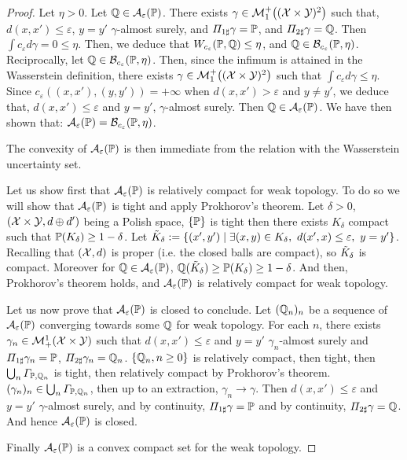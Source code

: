 \begin{proof}
Let $\eta>0$. Let $\mathbb{Q}\in\mathcal{A}_\varepsilon(\mathbb{P})$. There exists $\gamma\in
\mathcal{M}^+_1\left((\XX\times\YY)^2\right)$ such that, $d(x,x')\leq\varepsilon$, $y=y'$ $\gamma$-almost surely, and $\Pi_{1\sharp}\gamma=\mathbb{P}$, and $\Pi_{2\sharp}\gamma=\mathbb{Q}$. Then $\int c_\varepsilon d \gamma = 0\leq \eta$. Then, we deduce that $W_{c_\varepsilon}(\mathbb{P},\mathbb{Q})\leq \eta$, and $\mathbb{Q}\in\mathcal{B}_{c_\varepsilon}(\mathbb{P},\eta)$. Reciprocally, let $\mathbb{Q}\in\mathcal{B}_{c_\varepsilon}(\mathbb{P},\eta)$. Then, since the infimum is attained in the Wasserstein definition, there exists $\gamma\in
\mathcal{M}^+_1\left((\XX\times\YY)^2\right)$ such that $\int c_\varepsilon d \gamma \leq \eta$. Since $c_\varepsilon((x,x'),(y,y'))=+\infty$ when $d(x,x')>\varepsilon$ and $y\neq y'$, we deduce that, $d(x,x')\leq\varepsilon$ and $y=y'$, $\gamma$-almost surely. Then $\mathbb{Q}\in\mathcal{A}_\varepsilon(\mathbb{P})$. We have then shown that: $\mathcal{A}_\varepsilon(\mathbb{P})=\mathcal{B}_{c_\varepsilon}(\mathbb{P},\eta)$.

The convexity of $\mathcal{A}_\varepsilon(\mathbb{P})$ is then immediate from the relation with the Wasserstein uncertainty set.

Let us show first that $\mathcal{A}_\varepsilon(\mathbb{P})$ is relatively compact for weak topology. To do so we will show that $\mathcal{A}_\varepsilon(\mathbb{P})$ is tight and apply Prokhorov's theorem. Let $\delta>0$, $(\mathcal{X}\times \mathcal{Y},d\oplus d')$ being a Polish space, $\{\mathbb{P}\}$ is tight then there exists $K_\delta$ compact such that $\mathbb{P}(K_\delta)\geq1-\delta$.
Let $\Tilde{K}_\delta:=\left\{(x',y')\mid \exists (x,y)\in K_\delta,~ d(x',x)\leq\varepsilon,~y=y'\right\}$.  Recalling that $(\mathcal{X},d)$ is proper (i.e. the closed balls are compact), so $\Tilde{K}_\delta$ is compact. Moreover for $\mathbb{Q}\in\mathcal{A}_\varepsilon(\mathbb{P})$, $\mathbb{Q}(\Tilde{K}_\delta)\geq \mathbb{P}(K_\delta)\geq 1-\delta$. And then, Prokhorov's theorem holds, and $\mathcal{A}_\varepsilon(\mathbb{P})$ is relatively compact for weak topology.

Let us now prove that $\mathcal{A}_\varepsilon(\mathbb{P})$ is closed to conclude.  Let $(\mathbb{Q}_n)_n$ be a sequence of $\mathcal{A}_\varepsilon(\mathbb{P})$ converging towards some $\mathbb{Q}$ for weak topology. For each $n$, there exists $\gamma_n\in \mathcal{M}^1_+(\mathcal{X}\times\mathcal{Y})$ such that $d(x,x')\leq\varepsilon$ and $y=y'$ $\gamma_n$-almost surely and $\Pi_{1\sharp}\gamma_n=\mathbb{P}$, $\Pi_{2\sharp}\gamma_n=\mathbb{Q}_n$. $\{\mathbb{Q}_n,n\geq0\}$ is relatively compact, then tight, then $\bigcup_n \Gamma_{\mathbb{P},\mathbb{Q}_n}$ is tight, then relatively compact by Prokhorov's theorem. $(\gamma_n)_n\in\bigcup_n \Gamma_{\mathbb{P},\mathbb{Q}_n}$, then up to an extraction,  $\gamma_n\to\gamma$. Then $d(x,x')\leq\varepsilon$ and $y=y'$ $\gamma$-almost surely, and by continuity, $\Pi_{1\sharp}\gamma=\mathbb{P}$ and by continuity, $\Pi_{2\sharp}\gamma=\mathbb{Q}$. And hence $\mathcal{A}_\varepsilon(\mathbb{P})$ is closed.

Finally $\mathcal{A}_\varepsilon(\mathbb{P})$ is a convex compact set for the weak topology. 
\end{proof}




